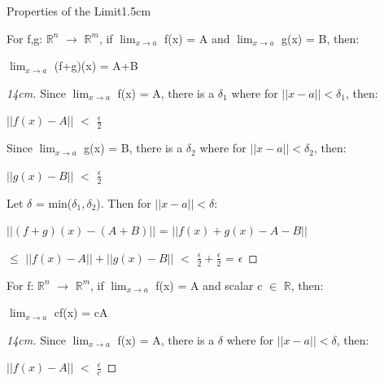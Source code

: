     \begin{ltheorem}{Properties of the Limit}{1.5cm}
        \item For f,g: $\mathbb{R}^n$ $\rightarrow$ $\mathbb{R}^m$, if
            $\lim_{x \rightarrow a}$ f(x) = A and
            $\lim_{x \rightarrow a}$ g(x) = B, then:

            \hspace{0.5cm}
            $\lim_{x \rightarrow a}$ (f+g)(x) = A+B

            \begin{proof}[14cm]
                Since $\lim_{x \rightarrow a}$ f(x) = A, there is a $\delta_1$
                where for $||x-a|| < \delta_1$, then:

                \hspace{0.5cm}
                $||f(x) - A||$ $<$ $\frac{\epsilon}{2}$

                Since $\lim_{x \rightarrow a}$ g(x) = B, there is a $\delta_2$
                where for $||x-a|| < \delta_2$, then:

                \hspace{0.5cm}
                $||g(x) - B||$ $<$ $\frac{\epsilon}{2}$

                Let $\delta$ = min($\delta_1,\delta_2$).
                Then for $||x-a|| < \delta$:

                \hspace{0.5cm}
                $||(f+g)(x) - (A+B)||$
                = $||f(x)+g(x) - A - B||$

                \hspace{0.5cm}
                $\leq$ $||f(x) - A|| + ||g(x) - B||$
                $<$ $\frac{\epsilon}{2} + \frac{\epsilon}{2}$
                = $\epsilon$
            \end{proof}

        \item For f: $\mathbb{R}^n$ $\rightarrow$ $\mathbb{R}^m$, if
            $\lim_{x \rightarrow a}$ f(x) = A and scalar c $\in$ $\mathbb{R}$, then:
        
            \hspace{0.5cm}
            $\lim_{x \rightarrow a}$ cf(x) = cA

            \begin{proof}[14cm]
                Since $\lim_{x \rightarrow a}$ f(x) = A, there is a $\delta$
                where for $||x-a|| < \delta$, then:

                \hspace{0.5cm}
                $||f(x) - A||$ $<$ $\frac{\epsilon}{c}$


\end{proof}
\end{ltheorem}

